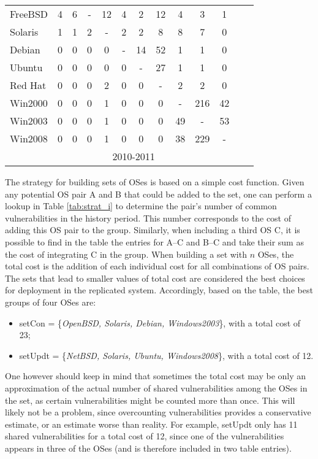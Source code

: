 \begin{table}[!ht]
\begin{center}
{\begin{tabular}{|l|c|c|c|c|c|c|c|c|c|c|c|c|}
FreeBSD & 4 & 6 & - & 12 & 4 & 2 & 12 & 4 & 3 & 1& \\ \cline{1-11}
Solaris & 1 & 1 & 2 & - & 2 & 2 & 8 & 8 & 7 & 0 &\\ \cline{1-11}
Debian & 0 & 0 & 0 & 0 & - & 14 & 52 & 1 & 1 & 0 &\\ \cline{1-11}
Ubuntu & 0 & 0 & 0 & 0 & 0 & - & 27 & 1 & 1 & 0 &\\ \cline{1-11}
Red Hat & 0 & 0 & 0 & 2 & 0 & 0 & - & 2 & 2 & 0 &\\ \cline{1-11}
Win2000 & 0 & 0 & 0 & 1 & 0 & 0 & 0 & - & 216 & 42 &\\ \cline{1-11}
Win2003 & 0 & 0 & 0 & 1 & 0 & 0 & 0 & 49 & - & 53 & \\ \cline{1-12}
Win2008 & 0 & 0 & 0 & 1 & 0 & 0 & 0 & 38 & 229 & -	& \multicolumn{1}{|c}{}  \\ \cline{1-11}
 \multicolumn{1}{c|}{}& \multicolumn{9}{|c|}{2010-2011} & \multicolumn{2}{|c}{}\\ \cline{2-10}
\end{tabular}
}
\end{center}
\end{table}

The strategy for building sets of OSes is based on a simple cost function. Given any potential OS pair A and B that could be added to the set, one can perform a lookup in Table \ref{tab:strat_i} to determine the pair's number of common vulnerabilities in the history period. This number corresponds to the cost of adding this OS pair to the group. Similarly, when including a third OS C, it is possible to find in the table the entries for A--C and B--C and take their sum as the cost of integrating C in the group. When building a set with $n$ OSes, the total cost is the addition of each individual cost for all combinations of OS pairs.
The sets that lead to smaller values of total cost are considered the best choices for deployment in the replicated system.
Accordingly, based on the table, the best groups of four OSes are:

\begin{itemize}
\item setCon = \{\emph{OpenBSD, Solaris, Debian, Windows2003}\}, with a total cost of 23;
\item setUpdt = \{\emph{NetBSD, Solaris, Ubuntu, Windows2008}\}, with a total cost of 12.%
\end{itemize}

One however should keep in mind that sometimes the total cost may be only an approximation of the actual number of shared vulnerabilities among the OSes in the set, as certain vulnerabilities might be counted more than once. This will likely not be a problem, since overcounting vulnerabilities provides a conservative estimate, or an estimate worse than reality. For example, setUpdt only has 11 shared vulnerabilities for a total cost of 12, since one of the vulnerabilities appears in three of the OSes (and is therefore included in two table entries).

